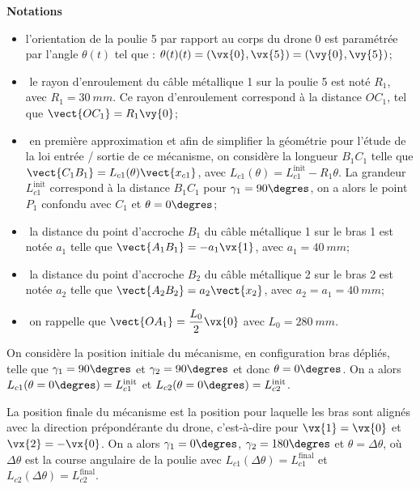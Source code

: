 \textbf{Notations}
\begin{itemize}
\item l’orientation de la poulie 5 par rapport au corps du drone 0 est paramétrée par l’angle
$\theta(t)$ tel que : $\theta(t)(t) = \left(\vx{0},\vx{5}\right) = \left(\vy{0},\vy{5}\right)$;
\item­ le rayon d’enroulement du câble métallique 1 sur la poulie 5 est noté $R_1$, avec
$R_1 = \SI{30}{mm}$. Ce rayon d’enroulement correspond à la distance $OC_1$, tel que $\vect{OC_1}= R_1\vy{0}$;
\item­ en première approximation et afin de simplifier la géométrie pour l’étude de la loi entrée
/ sortie de ce mécanisme, on considère la longueur $B_1C_1$ telle que $\vect{C_1B_1} = L_{c1}(\theta) \vect{x_{c1}}$, avec $L_{c1}(\theta) = L^{\text{init}}_{c1} - R_1\theta$. La grandeur $L^{\text{init}}_{c1}$ correspond à la distance $B_1C_1$ pour $\gamma_1 = 90\degres$, on a
alors le point $P_1$ confondu avec $C_1$ et $\theta = 0\degres$;
\item­ la distance du point d’accroche $B_1$ du câble métallique 1 sur le bras 1 est notée $a_1$ telle
que $\vect{A_1B_1} = -a_1 \vx{1}$, avec $a_1 = \SI{40}{mm}$;
\item­ la distance du point d’accroche $B_2$ du câble métallique 2 sur le bras 2 est notée $a_2$ telle
que $\vect{A_2B_2} = a_2 \vect{x_2}$, avec $a_2 = a_1 = \SI{40}{mm}$;
\item­ on rappelle que $\vect{OA_1} = \dfrac{L_0}{2}\vx{0}$  avec $L_0 = \SI{280}{mm}$.
\end{itemize}

On considère la position initiale du mécanisme, en configuration bras dépliés, telle que
$\gamma_1= 90\degres$ et $\gamma_2 = 90\degres$ et donc $\theta = 0\degres$. On a alors $L_{c1}(\theta = 0\degres) = L^{\text{init}}_{c1}$ et $L_{c2}(\theta = 0\degres) = L^{\text{init}}_{c2}$.

La position finale du mécanisme est la position pour laquelle les bras sont alignés avec la
direction prépondérante du drone, c’est-­à-­dire pour $\vx{1} = \vx{0}$ et $\vx{2} = -\vx{0}$. On a alors $\gamma_1 = 0\degres$, $\gamma_2 = 180\degres$ et $\theta = \Delta \theta$, où $\Delta \theta$ est la course angulaire de la poulie avec $L_{c1}(\Delta \theta) = L^{\text{final}}_{c1}$ et
$L_{c2}(\Delta \theta) = L^{\text{final}}_{c2}$.